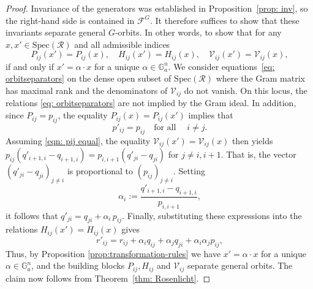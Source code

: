 \documentclass[12pt,a4paper]{extarticle}
\theoremstyle{definition}
\begin{document}
\begin{proof}
Invariance of the generators was established in
Proposition~\ref{prop: inv}, so the right‑hand side is contained in
$\mathcal{F}^G$. It therefore suffices to show that these invariants separate
general $G$‑orbits. In other words, to show that for any $x,x' \in \mathrm{Spec}(\mathcal R)$ and all admissible indices
\begin{equation}\label{eq: orbitseparators}
   P_{ij}(x')=P_{ij}(x),
  \quad
  H_{ij}(x')=H_{ij}(x),
  \quad
  \mathcal{V}_{ij}(x')=\mathcal{V}_{ij}(x),  
\end{equation}
if and only if  $x'=\alpha\cdot x$ for a unique $\alpha\in \mathbb{G}_a^n$. 
We consider equations~\eqref{eq: orbitseparators} on the dense open subset of $\mathrm{Spec}(\mathcal R)$ where the Gram matrix has maximal rank and the denominators of $\mathcal V_{ij}$ do not vanish.
On this
locus, the relations \eqref{eq: orbitseparators} are not implied by the Gram ideal.
In addition, since $P_{ij}=p_{ij}$, the equality $P_{ij}(x)=P_{ij}(x')$
implies that
\begin{equation}\label{eqn: pij equal}
p'_{ij}=p_{ij} \quad \text{for all} \quad  \;  i\neq j.
\end{equation}
Assuming \eqref{eqn: pij equal}, the equality $\mathcal V_{ij}(x')=\mathcal V_{ij}(x)$ then yields
$
  p_{ij}(q'_{i+1,i}-q_{i+1,i})
  =
  p_{i,i+1}(q'_{ji}-q_{ji})
$ for $j\neq i,i+1$.
That is, the vector
$(q'_{ji}-q_{ji})_{j\neq i}$ is proportional to $(p_{ij})_{j\neq i}$. Setting
\begin{equation*}\label{eq:alphai}
  \alpha_i := \frac{q'_{i+1, i}-q_{i+1, i}}{p_{i,i+1}},
\end{equation*}
it follows that
$
 q'_{ji}=q_{ji}+\alpha_i\,p_{ij}
$. Finally, substituting these expressions into the relations
$H_{ij}(x')=H_{ij}(x)$ gives
$$
  r'_{ij}
  =
  r_{ij}
  + \alpha_i q_{ij}
  + \alpha_j q_{ji}
  + \alpha_i\alpha_j p_{ij},
$$
Thus, by Proposition \ref{prop:transformation-rules} we have $x'=\alpha\cdot x$ for a unique $\alpha\in\mathbb G_a^n$, and the building blocks $P_{ij}, H_{ij}$ and $\mathcal{V}_{ij}$ separate general orbits. The claim now follows from Theorem~\ref{thm: Rosenlicht}.
\end{proof}
\end{document}

